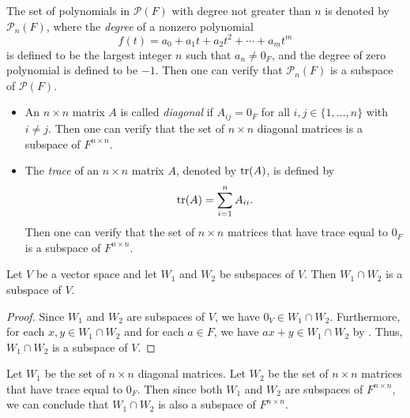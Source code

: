 \begin{example}
  The set of polynomials in $\mathcal{P}(F)$ with degree not greater than
  $n$ is denoted by $\mathcal{P}_n(F)$, where the \emph{degree} of a nonzero
  polynomial
  \begin{equation*}
    f(t) = a_0 + a_1t + a_2t^2 + \cdots + a_mt^m
  \end{equation*}
  is defined to be the largest integer $n$ such that $a_n \neq 0_F$, and the
  degree of zero polynomial is defined to be $-1$.
  Then one can verify that $\mathcal{P}_n(F)$ is a subspace of
  $\mathcal{P}(F)$.
\end{example}

\begin{examples}
  \leavevmode
  \begin{itemize}
    \item An $n \times n$ matrix $A$ is called \emph{diagonal} if
      $A_{ij} = 0_F$ for all $i, j \in \{1, \dots, n\}$ with $i \neq j$.
      Then one can verify that the set of $n \times n$ diagonal matrices is a
      subspace of $F^{n \times n}$.
    \item The \emph{trace} of an $n \times n$ matrix $A$, denoted by $\operatorname{tr}(A)$,
      is defined by
      \begin{equation*}
        \operatorname{tr}(A) = \sum_{i=1}^n A_{ii}.
      \end{equation*}
      Then one can verify that the set of $n \times n$ matrices that have trace
      equal to $0_F$ is a subspace of $F^{n \times n}$.
  \end{itemize}
\end{examples}

\begin{proposition}\label{prop:subspace-intersection}
  Let $V$ be a vector space and let $W_1$ and $W_2$ be subspaces of $V$.
  Then $W_1 \cap W_2$ is a subspace of $V$.
\end{proposition}
\begin{proof}
  Since $W_1$ and $W_2$ are subspaces of $V$, we have $0_V \in W_1 \cap W_2$.
  Furthermore, for each $x, y \in W_1 \cap W_2$ and for each $a \in F$, we have
  $ax + y \in W_1 \cap W_2$ by .
  Thus, $W_1 \cap W_2$ is a subspace of $V$.
\end{proof}

\begin{example}
  Let $W_1$ be the set of $n \times n$ diagonal matrices.
  Let $W_2$ be the set of $n \times n$ matrices that have trace equal to $0_F$.
  Then since both $W_1$ and $W_2$ are subspaces of $F^{n \times n}$,
  we can conclude that $W_1 \cap W_2$ is also a subspace of $F^{n \times n}$.
\end{example}

